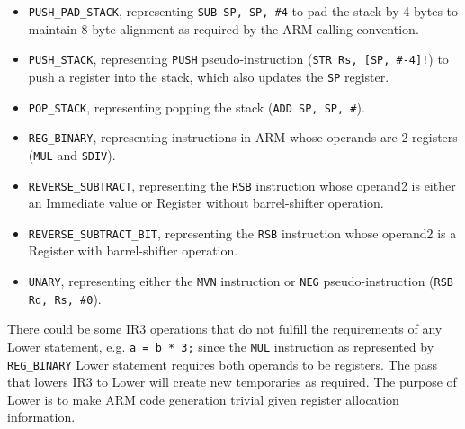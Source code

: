 \documentclass[nonacm, acmsmall, screen, 10pt]{acmart}
\begin{document}
\begin{itemize}
  \item \texttt{PUSH\_PAD\_STACK}, representing \texttt{SUB SP, SP, \#4} to pad the stack by 4 bytes to maintain 8-byte alignment as required by the ARM calling convention.
  \item \texttt{PUSH\_STACK}, representing \texttt{PUSH} pseudo-instruction (\texttt{STR Rs, [SP, \#-4]!}) to push a register into the stack, which also updates the \texttt{SP} register.
  \item \texttt{POP\_STACK}, representing popping the stack (\texttt{ADD SP, SP, \#<number of bytes>}).
  \item \texttt{REG\_BINARY}, representing instructions in ARM whose operands are 2 registers (\texttt{MUL} and \texttt{SDIV}).
  \item \texttt{REVERSE\_SUBTRACT}, representing the \texttt{RSB} instruction whose operand2 is either an Immediate value or Register without barrel-shifter operation.
  \item \texttt{REVERSE\_SUBTRACT\_BIT}, representing the \texttt{RSB} instruction whose operand2 is a Register with barrel-shifter operation.
  \item \texttt{UNARY}, representing either the \texttt{MVN} instruction or \texttt{NEG} pseudo-instruction (\texttt{RSB Rd, Rs, \#0}).
\end{itemize}

There could be some IR3 operations that do not fulfill the requirements of any Lower statement, e.g. \texttt{a = b * 3;} since the \texttt{MUL} instruction as represented by \texttt{REG\_BINARY} Lower statement requires both operands to be registers.
The pass that lowers IR3 to Lower will create new temporaries as required.
The purpose of Lower is to make ARM code generation trivial given register allocation information.
\end{document}
